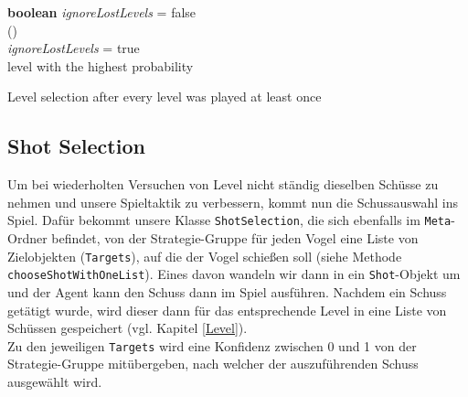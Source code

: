 \begin{algorithm}[H]
  \begin{algorithmic}[1]
  	\State \textbf{boolean} \textit{ignoreLostLevels} = false
  	\\
  	\State {}() 
  	\\
  		 		\hspace{\algorithmicindent}  \Return {} 
			\Else  
				\State \textit{ignoreLostLevels} = true
  		 	\EndIf
  		\Else
  			\Return {}
  		\EndIf
  	\EndIf
  	\\
		\Return level with the highest probability  	
  	\EndIf
  \end{algorithmic}
  \caption{Level selection after every level was played at least once \label{lvlSelec}}
\end{algorithm}

\subsection{Shot Selection} \label{ShotSelection}
Um bei wiederholten Versuchen von Level nicht ständig dieselben Schüsse zu nehmen und unsere Spieltaktik zu verbessern, kommt nun die Schussauswahl ins Spiel. Dafür bekommt unsere Klasse \texttt{ShotSelection}, die sich ebenfalls im \texttt{Meta}-Ordner befindet, von der Strategie-Gruppe für jeden Vogel eine Liste von Zielobjekten (\texttt{Targets}), auf die der Vogel schie\ss en soll (siehe Methode \texttt{chooseShotWithOneList}). Eines davon wandeln wir dann in ein \texttt{Shot}-Objekt um und der Agent kann den Schuss dann im Spiel ausführen. Nachdem ein Schuss getätigt wurde, wird dieser dann für das entsprechende Level in eine Liste von Schüssen gespeichert (vgl. Kapitel \ref{Level}). \\
Zu den jeweiligen \texttt{Targets} wird eine Konfidenz zwischen 0 und 1 von der Strategie-Gruppe mitübergeben, nach welcher der auszuführenden Schuss ausgewählt wird. 

